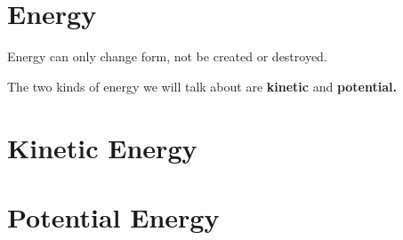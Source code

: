 \section{Energy}\label{energy}

Energy can only change form, not be created or destroyed.

The two kinds of energy we will talk about are \textbf{kinetic} and
\textbf{potential.}

\section{Kinetic Energy}\label{kinetic-energy}

\section{Potential Energy}\label{potential-energy}
